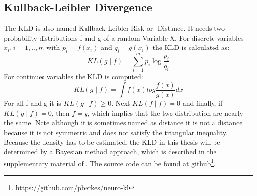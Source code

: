 \subsection{Kullback-Leibler Divergence}\label{TlSubSecKLD}
The \acl{KLD} is also named Kullback-Leibler-Risk or -Distance.
It needs two probability distributions f and g of a random Variable X.
For discrete variables $x_i, i=1,..,m$ with $p_i=f(x_i)$ and $q_i=g(x_i)$ the \acs{KLD} is calculated as:
\begin{equation}
KL(g\mid f) = \sum_{i=1}^{m}p_i\log\frac{p_i}{q_i}
\end{equation} 
For continues variables the \ac{KLD} is computed:
\begin{equation}
KL(g\mid f) = \int f(x)log\frac{f(x)}{g(x)} dx
\end{equation}
For all f and g it is $KL(g\mid f) \ge 0$. Next $KL(f\mid f) = 0$ and finally, if $KL(g\mid f) = 0$, then $f = g$, which implies that the two distribution are nearly the same.
Note although it is sometimes named as distance it is not a distance because it is not symmetric and does not satisfy the triangular inequality.\cite[p.5-7]{Commenges.}\\
Because the density has to be estimated, the \acs{KLD} in this thesis will be determined by a Bayesian method approach, which is described in the supplementary material of \cite{Berkes.2011}.
The source code can be found at github\footnote{https://github.com/pberkes/neuro-kl}.

